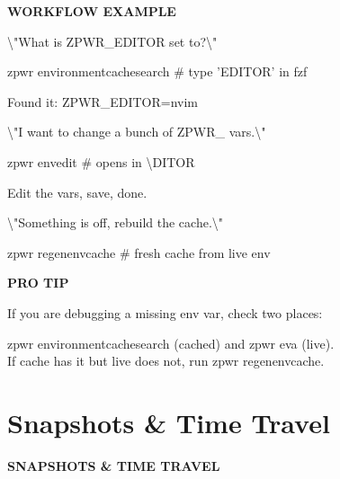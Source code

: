 \documentclass[11pt,a4paper,twoside]{book}
\begin{document}
\vspace{12pt}
{\bfseries\color{neonyellow} WORKFLOW EXAMPLE}\vspace{4pt}

\textbackslash{}"What is ZPWR\_EDITOR set to?\textbackslash{}"

\begin{codebox}
zpwr environmentcachesearch    \# type 'EDITOR' in fzf\\
\end{codebox}

Found it: ZPWR\_EDITOR=nvim

\textbackslash{}"I want to change a bunch of ZPWR\_ vars.\textbackslash{}"

\begin{codebox}
zpwr envedit                       \# opens in \textbackslash{}DITOR\\
\end{codebox}

Edit the vars, save, done.

\textbackslash{}"Something is off, rebuild the cache.\textbackslash{}"

\begin{codebox}
zpwr regenenvcache                 \# fresh cache from live env\\
\end{codebox}


\vspace{12pt}
{\bfseries\color{neonyellow} PRO TIP}\vspace{4pt}

If you are debugging a missing env var, check two places:

\begin{codebox}
zpwr environmentcachesearch (cached) and zpwr eva (live).\\
If cache has it but live does not, run zpwr regenenvcache.\\
\end{codebox}


\vspace{16pt}

\section{Snapshots \& Time Travel}


\vspace{10pt}
{\large\bfseries\color{neoncyan} SNAPSHOTS \& TIME TRAVEL}\vspace{6pt}
\end{document}
